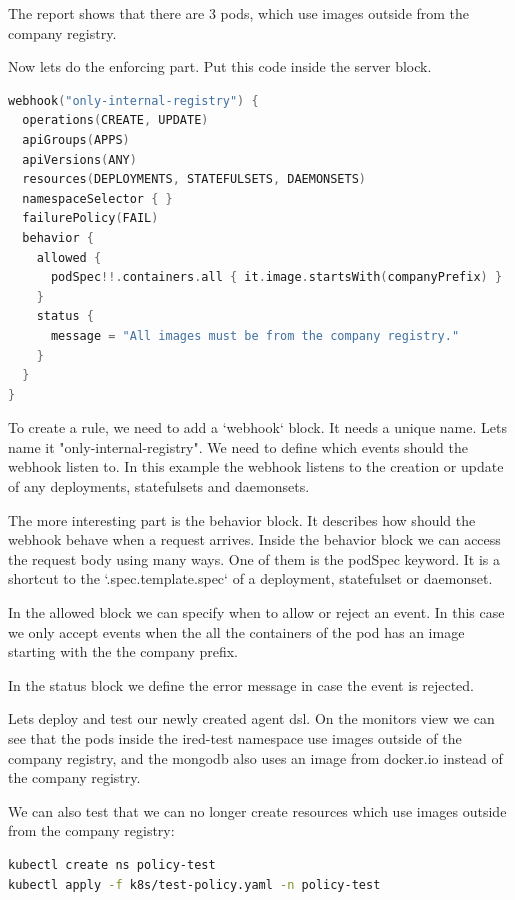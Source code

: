 The report shows that there are 3 pods, which use images outside from the company registry.

Now lets do the enforcing part. Put this code inside the server block.

\begin{lstlisting}[caption={TODO},language=Kotlin,label=code:todo]
webhook("only-internal-registry") {
  operations(CREATE, UPDATE)
  apiGroups(APPS)
  apiVersions(ANY)
  resources(DEPLOYMENTS, STATEFULSETS, DAEMONSETS)
  namespaceSelector { }
  failurePolicy(FAIL)
  behavior {
    allowed {
      podSpec!!.containers.all { it.image.startsWith(companyPrefix) }
    }
    status {
      message = "All images must be from the company registry."
    }
  }
}
\end{lstlisting}

To create a rule, we need to add a `webhook` block. It needs a unique name. Lets name it "only-internal-registry". We need to define which events should the webhook listen to. In this example the webhook listens to the creation or update of any deployments, statefulsets and daemonsets.

The more interesting part is the behavior block. It describes how should the webhook behave when a request arrives. Inside the behavior block we can access the request body using many ways. One of them is the podSpec keyword. It is a shortcut to the `.spec.template.spec` of a deployment, statefulset or daemonset.

In the allowed block we can specify when to allow or reject an event. In this case we only accept events when the all the containers of the pod has an image starting with the the company prefix.

In the status block we define the error message in case the event is rejected.

Lets deploy and test our newly created agent dsl. On the monitors view we can see that the pods inside the ired-test namespace use images outside of the company registry, and the mongodb also uses an image from docker.io instead of the company registry.

We can also test that we can no longer create resources which use images outside from the company registry:

\begin{lstlisting}[caption={TODO},language=bash,label=code:bashx]
kubectl create ns policy-test
kubectl apply -f k8s/test-policy.yaml -n policy-test
\end{lstlisting}


